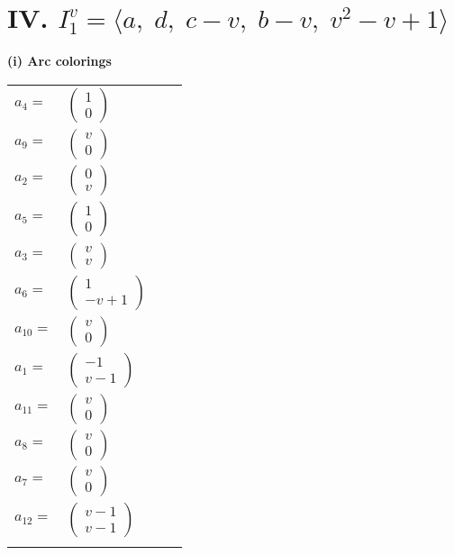 \documentclass[1p]{elsarticle_modified}
\theoremstyle{definition}
\begin{document}
\centering \section*{IV. $I^v_{1}= \langle a,\;d,\;c- v,\;b- v,\;v^2- v+1 \rangle$}
\flushleft \textbf{(i) Arc colorings}\\
\begin{tabular}{m{7pt} m{180pt} m{7pt} m{180pt} }
\flushright $a_{4}=$&$\begin{pmatrix}1\\0\end{pmatrix}$ \\
\flushright $a_{9}=$&$\begin{pmatrix}v\\0\end{pmatrix}$ \\
\flushright $a_{2}=$&$\begin{pmatrix}0\\v\end{pmatrix}$ \\
\flushright $a_{5}=$&$\begin{pmatrix}1\\0\end{pmatrix}$ \\
\flushright $a_{3}=$&$\begin{pmatrix}v\\v\end{pmatrix}$ \\
\flushright $a_{6}=$&$\begin{pmatrix}1\\- v+1\end{pmatrix}$ \\
\flushright $a_{10}=$&$\begin{pmatrix}v\\0\end{pmatrix}$ \\
\flushright $a_{1}=$&$\begin{pmatrix}-1\\v-1\end{pmatrix}$ \\
\flushright $a_{11}=$&$\begin{pmatrix}v\\0\end{pmatrix}$ \\
\flushright $a_{8}=$&$\begin{pmatrix}v\\0\end{pmatrix}$ \\
\flushright $a_{7}=$&$\begin{pmatrix}v\\0\end{pmatrix}$ \\
\flushright $a_{12}=$&$\begin{pmatrix}v-1\\v-1\end{pmatrix}$\\&\end{tabular}
\end{document}
